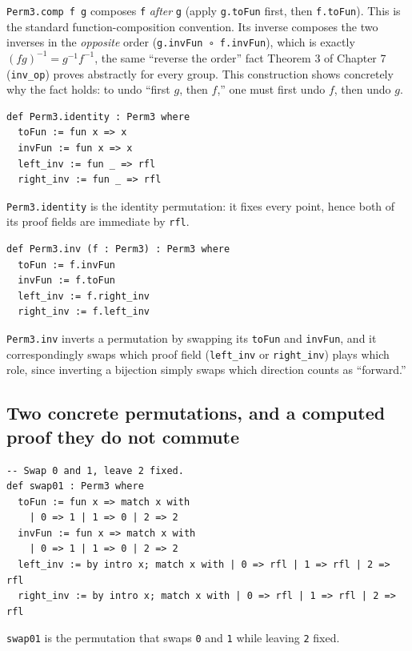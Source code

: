 \texttt{Perm3.comp f g} composes \texttt{f} \emph{after} \texttt{g} (apply \texttt{g.toFun} first, then \texttt{f.toFun}). This is the standard function-composition convention. Its inverse composes the two inverses in the \emph{opposite} order (\texttt{g.invFun ∘ f.invFun}), which is exactly \((fg)^{-1} = g^{-1}f^{-1}\), the same ``reverse the order'' fact Theorem 3 of Chapter 7 (\texttt{inv\_\allowbreak{}op}) proves abstractly for every group. This construction shows concretely why the fact holds: to undo ``first \(g\), then \(f\),'' one must first undo \(f\), then undo \(g\).

\begin{lstlisting}
def Perm3.identity : Perm3 where
  toFun := fun x => x
  invFun := fun x => x
  left_inv := fun _ => rfl
  right_inv := fun _ => rfl
\end{lstlisting}

\texttt{Perm3.identity} is the identity permutation: it fixes every point, hence both of its proof fields are immediate by \texttt{rfl}.

\begin{lstlisting}
def Perm3.inv (f : Perm3) : Perm3 where
  toFun := f.invFun
  invFun := f.toFun
  left_inv := f.right_inv
  right_inv := f.left_inv
\end{lstlisting}

\texttt{Perm3.inv} inverts a permutation by swapping its \texttt{toFun} and \texttt{invFun}, and it correspondingly swaps which proof field (\texttt{left\_\allowbreak{}inv} or \texttt{right\_\allowbreak{}inv}) plays which role, since inverting a bijection simply swaps which direction counts as ``forward.''

\subsection{Two concrete permutations, and a computed proof they do not commute}\label{sec:06-groups:04-permutations-example:4}

\begin{lstlisting}
-- Swap 0 and 1, leave 2 fixed.
def swap01 : Perm3 where
  toFun := fun x => match x with
    | 0 => 1 | 1 => 0 | 2 => 2
  invFun := fun x => match x with
    | 0 => 1 | 1 => 0 | 2 => 2
  left_inv := by intro x; match x with | 0 => rfl | 1 => rfl | 2 => rfl
  right_inv := by intro x; match x with | 0 => rfl | 1 => rfl | 2 => rfl
\end{lstlisting}

\texttt{swap01} is the permutation that swaps \texttt{0} and \texttt{1} while leaving \texttt{2} fixed.

